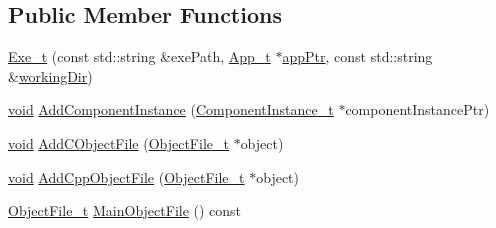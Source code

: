 \subsection*{Public Member Functions}
\begin{DoxyCompactItemize}
\item 
\hyperlink{struct_exe__t_a260e1622d00506896377772df7e01bdb}{Exe\+\_\+t} (const std\+::string \&exe\+Path, \hyperlink{struct_app__t}{App\+\_\+t} $\ast$\hyperlink{struct_exe__t_a740d3033ba4d073c992ebcb2c2f001e7}{app\+Ptr}, const std\+::string \&\hyperlink{struct_exe__t_aabb64244de93a7b0f75134a12c445874}{working\+Dir})
\item 
\hyperlink{_t_e_m_p_l_a_t_e__cdef_8h_ac9c84fa68bbad002983e35ce3663c686}{void} \hyperlink{struct_exe__t_ae7719e6a05129ae4ceb230a7120b8701}{Add\+Component\+Instance} (\hyperlink{struct_component_instance__t}{Component\+Instance\+\_\+t} $\ast$component\+Instance\+Ptr)
\item 
\hyperlink{_t_e_m_p_l_a_t_e__cdef_8h_ac9c84fa68bbad002983e35ce3663c686}{void} \hyperlink{struct_exe__t_ad8633791e1282effc5384a4e19329eb0}{Add\+C\+Object\+File} (\hyperlink{struct_object_file__t}{Object\+File\+\_\+t} $\ast$object)
\item 
\hyperlink{_t_e_m_p_l_a_t_e__cdef_8h_ac9c84fa68bbad002983e35ce3663c686}{void} \hyperlink{struct_exe__t_ada520aa77b110dc10403bbf61cbe2900}{Add\+Cpp\+Object\+File} (\hyperlink{struct_object_file__t}{Object\+File\+\_\+t} $\ast$object)
\item 
\hyperlink{struct_object_file__t}{Object\+File\+\_\+t} \hyperlink{struct_exe__t_aacc480b1d792e676472af02dcbd78d49}{Main\+Object\+File} () const 
\end{DoxyCompactItemize}
